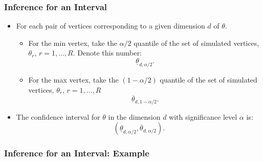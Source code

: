 \documentclass[10pt,letterpaper]{beamer}
\begin{document}
\begin{frame}
\frametitle{Inference for an Interval}

\begin{itemize}
	\item For each pair of vertices corresponding to a given dimension $d$ of $\theta$.
	\begin{itemize}
		\item For the min vertex, take the $\alpha/2$ quantile of the set of simulated vertices, $\theta_{r}$, $r=1,\dots,R$. Denote this number:
		\begin{equation*}
		\underline{\theta}_{d,\alpha/2}.
		\end{equation*}
		\item For the max vertex, take the $(1-\alpha/2)$ quantile of the set of simulated vertices, $\theta_{r}$, $r=1,\dots,R$
		\begin{equation*}
		\overline{\theta}_{d,1-\alpha/2}.
		\end{equation*}
	\end{itemize}
	\item The confidence interval for $\theta$ in the dimension $d$ with significance level $\alpha$ is:
	\begin{equation*}
	(\underline{\theta}_{d,\alpha/2},\overline{\theta}_{d,\alpha/2}).
	\end{equation*}
\end{itemize}
\end{frame}
\begin{frame}
\frametitle{Inference for an Interval: Example}

\begin{figure}[h!]
\begin{center}
\end{center}
\end{figure}	
\end{frame}
\end{document}
